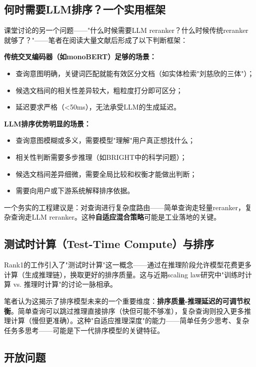 \documentclass[12pt,a4paper]{article}
\begin{document}
\subsection{何时需要LLM排序？一个实用框架}

课堂讨论的另一个问题——"什么时候需要LLM reranker？什么时候传统reranker就够了？"——笔者在阅读大量文献后形成了以下判断框架：

\textbf{传统交叉编码器（如monoBERT）足够的场景：}
\begin{itemize}[noitemsep]
    \item 查询意图明确，关键词匹配就能有效区分文档（如实体检索"刘慈欣的三体"）；
    \item 候选文档间的相关性差异较大，粗粒度打分即可区分；
    \item 延迟要求严格（<50ms），无法承受LLM的生成延迟。
\end{itemize}

\textbf{LLM排序优势明显的场景：}
\begin{itemize}[noitemsep]
    \item 查询意图模糊或多义，需要模型"理解"用户真正想找什么；
    \item 相关性判断需要多步推理（如BRIGHT中的科学问题）；
    \item 候选文档间差异细微，需要全局比较和权衡才能做出判断；
    \item 需要向用户或下游系统解释排序依据。
\end{itemize}

一个务实的工程建议是：对查询进行复杂度路由——简单查询走轻量reranker，复杂查询走LLM reranker。这种\textbf{自适应混合策略}可能是工业落地的关键。

\subsection{测试时计算（Test-Time Compute）与排序}

Rank1\cite{weller2025rank1}的工作引入了"测试时计算"这一概念——通过在推理阶段允许模型花费更多计算（生成推理链），换取更好的排序质量。这与近期scaling law研究中"训练时计算 vs. 推理时计算"的讨论一脉相承。

笔者认为这揭示了排序模型未来的一个重要维度：\textbf{排序质量-推理延迟的可调节权衡}。简单查询可以跳过推理直接排序（快但可能不够准），复杂查询则投入更多推理计算（慢但更准确）。这种"自适应推理深度"的能力——简单任务少思考、复杂任务多思考——可能是下一代排序模型的关键特征。

\subsection{开放问题}
\end{document}
